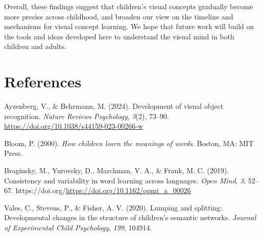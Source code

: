 \documentclass[
  man,floatsintext]{apa6}
\newlength{\cslhangindent}
\newenvironment{CSLReferences}[2] %
 {\begin{list}{}{%
  \setlength{\itemindent}{0pt}
  \setlength{\leftmargin}{0pt}
  \setlength{\parsep}{0pt}
  \ifodd #1
   \setlength{\leftmargin}{\cslhangindent}
   \setlength{\itemindent}{-1\cslhangindent}
  \fi
  \setlength{\itemsep}{#2\baselineskip}}}
 {\end{list}}
\begin{document}
Overall, these findings suggest that children's visual concepts gradually become more precise across childhood, and broaden our view on the timeline and mechanisms for visual concept learning. We hope that future work will build on the tools and ideas developed here to understand the visual mind in both children and adults.

\newpage

\section{References}\label{references}

\label{refs}
\begin{CSLReferences}{1}{0}
Ayzenberg, V., \& Behrmann, M. (2024). Development of visual object recognition. \emph{Nature Reviews Psychology}, \emph{3}(2), 73--90. \url{https://doi.org/10.1038/s44159-023-00266-w}

Bloom, P. (2000). \emph{How children learn the meanings of words}. Boston, MA: MIT Press.

Braginsky, M., Yurovsky, D., Marchman, V. A., \& Frank, M. C. (2019). Consistency and variability in word learning across languages. \emph{Open Mind}, \emph{3}, 52--67. https://doi.org/\url{https://doi.org/10.1162/opmi_a_00026}

Vales, C., Stevens, P., \& Fisher, A. V. (2020). Lumping and splitting: {Developmental} changes in the structure of children's semantic networks. \emph{Journal of Experimental Child Psychology}, \emph{199}, 104914.

\end{CSLReferences}


\clearpage
\renewcommand{\listfigurename}{Figure captions}
\end{document}
